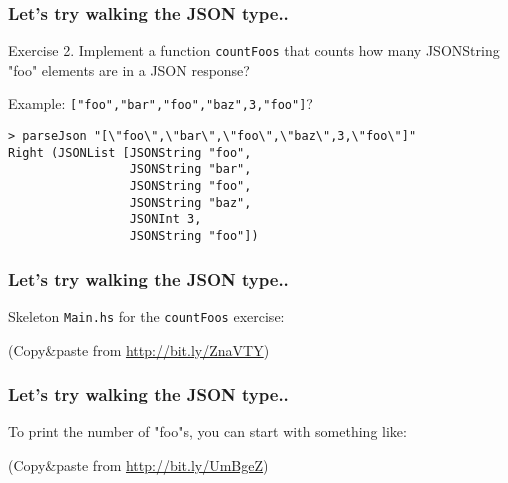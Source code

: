 \documentclass{beamer}
\begin{document}
\begin{frame}[fragile]
\frametitle{Let's try walking the JSON type..}

Exercise 2. Implement a function \verb+countFoos+ that counts how many
JSONString "foo" elements are in a JSON response?

\bigskip

Example: \verb+["foo","bar","foo","baz",3,"foo"]+?

{\small
\begin{verbatim}
> parseJson "[\"foo\",\"bar\",\"foo\",\"baz\",3,\"foo\"]"
Right (JSONList [JSONString "foo",
                 JSONString "bar",
                 JSONString "foo",
                 JSONString "baz",
                 JSONInt 3,
                 JSONString "foo"])
\end{verbatim}
}

\end{frame}


\begin{frame}[fragile]
\frametitle{Let's try walking the JSON type..}

Skeleton \verb+Main.hs+ for the \verb+countFoos+ exercise:

{\small

}

(Copy\&paste from \href{http://bit.ly/ZnaVTY}{http://bit.ly/ZnaVTY})
\end{frame}


\begin{frame}[fragile]
\frametitle{Let's try walking the JSON type..}

To print the number of "foo"s, you can start with something like:

{\small

}

(Copy\&paste from \href{http://bit.ly/UmBgeZ}{http://bit.ly/UmBgeZ})
\end{frame}
\end{document}
